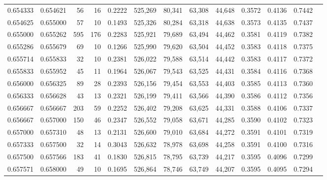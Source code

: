 \begin{tabular}{rrrrrrrrrrrrr}
0.654333 & 0.654621 &    56 &  16 &                                     0.2222 & 525,269 &  80,341 &  63,308 &  44,648 & 0.3572 & 0.4136 & 0.7442 \\
0.654625 & 0.655000 &    57 &  10 &                                     0.1493 & 525,326 &  80,284 &  63,318 &  44,638 & 0.3573 & 0.4135 & 0.7437 \\
0.655000 & 0.655262 &   595 & 176 &                                     0.2283 & 525,921 &  79,689 &  63,494 &  44,462 & 0.3581 & 0.4119 & 0.7382 \\
0.655286 & 0.655679 &    69 &  10 &                                     0.1266 & 525,990 &  79,620 &  63,504 &  44,452 & 0.3583 & 0.4118 & 0.7375 \\
0.655714 & 0.655833 &    32 &  10 &                                     0.2381 & 526,022 &  79,588 &  63,514 &  44,442 & 0.3583 & 0.4117 & 0.7372 \\
0.655833 & 0.655952 &    45 &  11 &                                     0.1964 & 526,067 &  79,543 &  63,525 &  44,431 & 0.3584 & 0.4116 & 0.7368 \\
0.656000 & 0.656325 &    89 &  28 &                                     0.2393 & 526,156 &  79,454 &  63,553 &  44,403 & 0.3585 & 0.4113 & 0.7360 \\
0.656333 & 0.656628 &    43 &  13 &                                     0.2321 & 526,199 &  79,411 &  63,566 &  44,390 & 0.3586 & 0.4112 & 0.7356 \\
0.656667 & 0.656667 &   203 &  59 &                                     0.2252 & 526,402 &  79,208 &  63,625 &  44,331 & 0.3588 & 0.4106 & 0.7337 \\
0.656667 & 0.657000 &   150 &  46 &                                     0.2347 & 526,552 &  79,058 &  63,671 &  44,285 & 0.3590 & 0.4102 & 0.7323 \\
0.657000 & 0.657310 &    48 &  13 &                                     0.2131 & 526,600 &  79,010 &  63,684 &  44,272 & 0.3591 & 0.4101 & 0.7319 \\
0.657333 & 0.657500 &    32 &  14 &                                     0.3043 & 526,632 &  78,978 &  63,698 &  44,258 & 0.3591 & 0.4100 & 0.7316 \\
0.657500 & 0.657566 &   183 &  41 &                                     0.1830 & 526,815 &  78,795 &  63,739 &  44,217 & 0.3595 & 0.4096 & 0.7299 \\
0.657571 & 0.658000 &    49 &  10 &                                     0.1695 & 526,864 &  78,746 &  63,749 &  44,207 & 0.3595 & 0.4095 & 0.7294 \\

\end{tabular}
